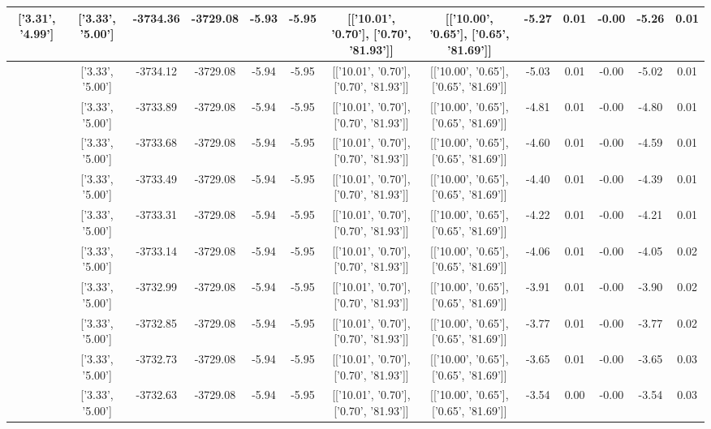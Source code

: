 \begin{table}[htbp]
\begin{adjustbox}{angle=90}
\begin{tabular}{|c|c|c|c|c|c|c|c|c|c|c|c|c|}
 ['3.31', '4.99'] & ['3.33', '5.00'] & -3734.36 & -3729.08 & -5.93 & -5.95 & [['10.01', '0.70'], ['0.70', '81.93']] & [['10.00', '0.65'], ['0.65', '81.69']] & -5.27 & 0.01 & -0.00 & -5.26 & 0.01\\ \hline
 ['3.31', '4.99'] & ['3.33', '5.00'] & -3734.12 & -3729.08 & -5.94 & -5.95 & [['10.01', '0.70'], ['0.70', '81.93']] & [['10.00', '0.65'], ['0.65', '81.69']] & -5.03 & 0.01 & -0.00 & -5.02 & 0.01\\ \hline
 ['3.31', '4.99'] & ['3.33', '5.00'] & -3733.89 & -3729.08 & -5.94 & -5.95 & [['10.01', '0.70'], ['0.70', '81.93']] & [['10.00', '0.65'], ['0.65', '81.69']] & -4.81 & 0.01 & -0.00 & -4.80 & 0.01\\ \hline
 ['3.31', '4.99'] & ['3.33', '5.00'] & -3733.68 & -3729.08 & -5.94 & -5.95 & [['10.01', '0.70'], ['0.70', '81.93']] & [['10.00', '0.65'], ['0.65', '81.69']] & -4.60 & 0.01 & -0.00 & -4.59 & 0.01\\ \hline
 ['3.32', '4.99'] & ['3.33', '5.00'] & -3733.49 & -3729.08 & -5.94 & -5.95 & [['10.01', '0.70'], ['0.70', '81.93']] & [['10.00', '0.65'], ['0.65', '81.69']] & -4.40 & 0.01 & -0.00 & -4.39 & 0.01\\ \hline
 ['3.32', '5.00'] & ['3.33', '5.00'] & -3733.31 & -3729.08 & -5.94 & -5.95 & [['10.01', '0.70'], ['0.70', '81.93']] & [['10.00', '0.65'], ['0.65', '81.69']] & -4.22 & 0.01 & -0.00 & -4.21 & 0.01\\ \hline
 ['3.32', '5.00'] & ['3.33', '5.00'] & -3733.14 & -3729.08 & -5.94 & -5.95 & [['10.01', '0.70'], ['0.70', '81.93']] & [['10.00', '0.65'], ['0.65', '81.69']] & -4.06 & 0.01 & -0.00 & -4.05 & 0.02\\ \hline
 ['3.32', '5.00'] & ['3.33', '5.00'] & -3732.99 & -3729.08 & -5.94 & -5.95 & [['10.01', '0.70'], ['0.70', '81.93']] & [['10.00', '0.65'], ['0.65', '81.69']] & -3.91 & 0.01 & -0.00 & -3.90 & 0.02\\ \hline
 ['3.32', '5.00'] & ['3.33', '5.00'] & -3732.85 & -3729.08 & -5.94 & -5.95 & [['10.01', '0.70'], ['0.70', '81.93']] & [['10.00', '0.65'], ['0.65', '81.69']] & -3.77 & 0.01 & -0.00 & -3.77 & 0.02\\ \hline
 ['3.32', '5.00'] & ['3.33', '5.00'] & -3732.73 & -3729.08 & -5.94 & -5.95 & [['10.01', '0.70'], ['0.70', '81.93']] & [['10.00', '0.65'], ['0.65', '81.69']] & -3.65 & 0.01 & -0.00 & -3.65 & 0.03\\ \hline
 ['3.32', '5.00'] & ['3.33', '5.00'] & -3732.63 & -3729.08 & -5.94 & -5.95 & [['10.01', '0.70'], ['0.70', '81.93']] & [['10.00', '0.65'], ['0.65', '81.69']] & -3.54 & 0.00 & -0.00 & -3.54 & 0.03\\ \hline

\end{tabular}
\end{adjustbox}
\end{table}
